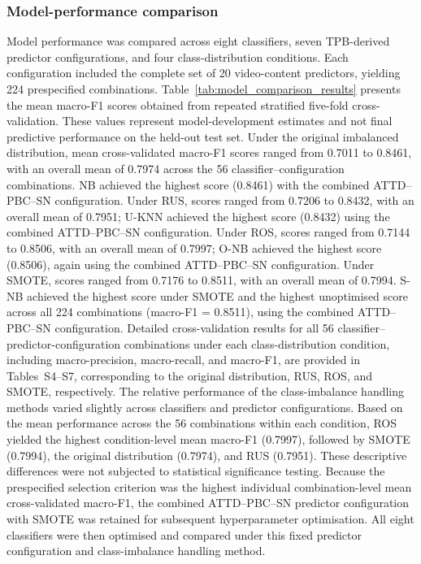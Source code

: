 \documentclass[jtaer,article,submit,moreauthors]{Definitions/mdpi}
\begin{document}
\subsubsection{Model-performance comparison}
Model performance was compared across eight classifiers, seven TPB-derived
predictor configurations, and four class-distribution conditions. Each
configuration included the complete set of 20 video-content predictors,
yielding 224 prespecified combinations. Table~\ref{tab:model_comparison_results}
presents the mean macro-F1 scores obtained from repeated stratified
five-fold cross-validation. These values represent model-development
estimates and not final predictive performance on the held-out test set.
Under the original imbalanced distribution, mean cross-validated
macro-F1 scores ranged from 0.7011 to 0.8461, with an overall mean of
0.7974 across the 56 classifier--configuration combinations. 
NB achieved the highest score (0.8461) with the combined ATTD--PBC--SN configuration.
Under RUS, scores ranged from 0.7206 to 0.8432, with an overall mean of
0.7951; U-KNN achieved the highest score (0.8432) using the combined
ATTD--PBC--SN configuration. Under ROS, scores ranged from 0.7144 to
0.8506, with an overall mean of 0.7997; O-NB achieved the highest score
(0.8506), again using the combined ATTD--PBC--SN configuration. Under
SMOTE, scores ranged from 0.7176 to 0.8511, with an overall mean of
0.7994. S-NB achieved the highest score under SMOTE and the highest
unoptimised score across all 224 combinations (macro-F1 = 0.8511),
using the combined ATTD--PBC--SN configuration.
Detailed cross-validation results for all 56
classifier--predictor-configuration combinations under each
class-distribution condition, including macro-precision, macro-recall,
and macro-F1, are provided in Tables~S4--S7, corresponding to the
original distribution, RUS, ROS, and SMOTE, respectively.
The relative performance of the class-imbalance handling methods varied
slightly across classifiers and predictor configurations. Based on the
mean performance across the 56 combinations within each condition, ROS
yielded the highest condition-level mean macro-F1 (0.7997), followed by
SMOTE (0.7994), the original distribution (0.7974), and RUS (0.7951).
These descriptive differences were not subjected to statistical
significance testing.
Because the prespecified selection criterion was the highest individual
combination-level mean cross-validated macro-F1, the combined
ATTD--PBC--SN predictor configuration with SMOTE was retained for
subsequent hyperparameter optimisation. All eight classifiers were then
optimised and compared under this fixed predictor configuration and
class-imbalance handling method.
\end{document}
